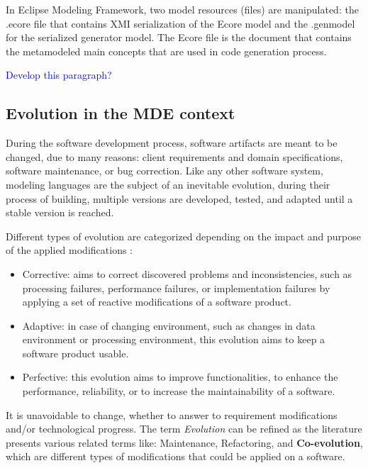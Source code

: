 In Eclipse Modeling Framework, two model resources (files) are manipulated: the .ecore file that contains  XMI serialization of the Ecore model and the .genmodel for the serialized generator model. The Ecore file is the document that contains the metamodeled main concepts that are used in code generation process.

\textcolor{blue}{Develop this paragraph?}
\subsection{Evolution in the MDE context}

During the software development process, software artifacts are meant to be changed, due to many reasons: client requirements and domain specifications, software maintenance, or bug correction. Like any other software system, modeling languages are the subject of an inevitable evolution, during their process of building, multiple versions are developed, tested, and adapted until a stable version is reached. 

Different types of evolution are categorized depending on the impact and purpose of the applied modifications \cite{lientz1980software,Swanson1976}:
\begin{itemize}
	
	\item  Corrective: aims to correct discovered problems and inconsistencies, such as processing failures, performance failures, or implementation failures by applying a set of reactive modifications of a software product.  
	
	\item  Adaptive: in case of changing environment, such as changes in data environment or processing environment, this evolution aims to keep a software product usable.
	
	\item Perfective: this evolution aims to improve functionalities, to enhance the performance, reliability, or to increase the maintainability of a software.  
	
\end{itemize}
It is unavoidable to change, whether to answer to requirement modifications and/or technological progress.
The term \textit{Evolution} can be refined as the literature presents various related terms like: Maintenance, Refactoring, and \textbf{Co-evolution}, which are different types of modifications that could be applied on a software.


